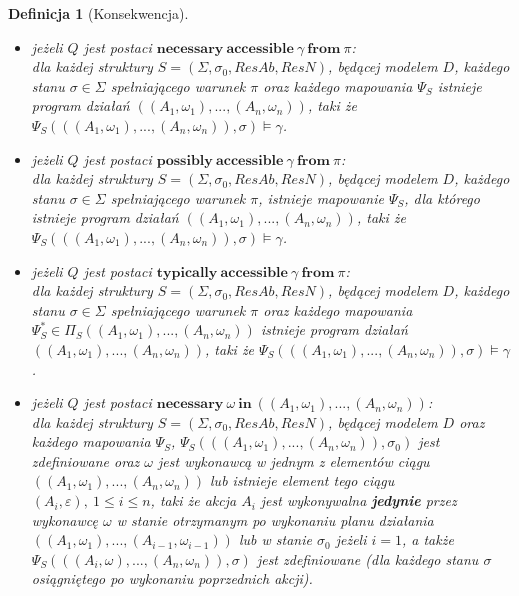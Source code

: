 \documentclass[11pt,a4paper]{article}
\newtheorem{definition}{Definicja}[section]
\begin{document}
\begin{definition}[Konsekwencja]
\begin{itemize}
    	\item jeżeli $Q$ jest postaci $\mathbf{necessary}~\mathbf{accessible}~\gamma~\mathbf{from}~\pi$: \\
    	dla każdej struktury $S=(\Sigma, \sigma_0, ResAb, ResN)$, będącej modelem $D$, każdego stanu $\sigma \in \Sigma$ spełniającego warunek $\pi$ oraz każdego mapowania $\Psi_S$ istnieje program działań $((A_1, \omega_1), ..., (A_n, \omega_n))$, taki że $\Psi_S(((A_1, \omega_1), ..., (A_n, \omega_n)), \sigma) \models \gamma$.
    	
    	\item jeżeli $Q$ jest postaci $\mathbf{possibly}~\mathbf{accessible}~\gamma~\mathbf{from}~\pi$: \\
    	dla każdej struktury $S=(\Sigma, \sigma_0, ResAb, ResN)$, będącej modelem $D$, każdego stanu $\sigma \in \Sigma$ spełniającego warunek $\pi$, istnieje mapowanie $\Psi_S$, dla którego istnieje program działań $((A_1, \omega_1), ..., (A_n, \omega_n))$, taki że $\Psi_S(((A_1, \omega_1), ..., (A_n, \omega_n)), \sigma) \models \gamma$.
    	
    	\item jeżeli $Q$ jest postaci $\mathbf{typically}~\mathbf{accessible}~\gamma~\mathbf{from}~\pi$: \\
    	dla każdej struktury $S=(\Sigma, \sigma_0, ResAb, ResN)$, będącej modelem $D$, każdego stanu $\sigma \in \Sigma$ spełniającego warunek $\pi$ oraz każdego mapowania $\Psi_S^{*} \in \Pi_S((A_1, \omega_1),...,(A_n,\omega_n))$ istnieje program działań $((A_1, \omega_1), ..., (A_n, \omega_n))$, taki że $\Psi_S(((A_1, \omega_1), ..., (A_n, \omega_n)), \sigma) \models \gamma$.
    	
    	\item jeżeli $Q$ jest postaci $\mathbf{necessary}~\omega~\mathbf{in}~((A_1, \omega_1),...,(A_n,\omega_n))$: \\
    	 dla każdej struktury $S=(\Sigma, \sigma_0, ResAb, ResN)$, będącej modelem $D$ oraz każdego mapowania $\Psi_S$, $\Psi_S(((A_1, \omega_1), ..., (A_n, \omega_n)), \sigma_0)$ jest zdefiniowane oraz $\omega$ jest wykonawcą w jednym z elementów ciągu $((A_1, \omega_1),...,(A_n,\omega_n))$ lub istnieje element tego ciągu $(A_i, \varepsilon),~1 \leq i \leq n$, taki że akcja $A_i$ jest wykonywalna \textbf{jedynie} przez wykonawcę $\omega$ w stanie otrzymanym po wykonaniu planu działania $((A_1, \omega_1),...,(A_{i-1},\omega_{i-1}))$ lub w stanie $\sigma_0$ jeżeli $i=1$, a także $\Psi_S(((A_i, \omega), ..., (A_n, \omega_n)), \sigma)$ jest zdefiniowane (dla każdego stanu $\sigma$ osiągniętego po wykonaniu poprzednich akcji).
    	 

\end{itemize}
\end{definition}
\end{document}
